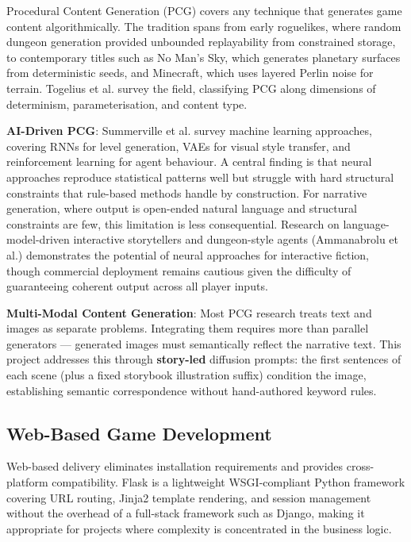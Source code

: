 \documentclass[12pt,a4paper]{article}
\begin{document}
Procedural Content Generation (PCG) covers any technique that generates game content algorithmically. The tradition spans from early roguelikes, where random dungeon generation provided unbounded replayability from constrained storage, to contemporary titles such as No Man's Sky, which generates planetary surfaces from deterministic seeds, and Minecraft, which uses layered Perlin noise for terrain. Togelius et al. \cite{togelius2011assessing} survey the field, classifying PCG along dimensions of determinism, parameterisation, and content type.

\textbf{AI-Driven PCG}: Summerville et al. \cite{summerville2018procedural} survey machine learning approaches, covering RNNs for level generation, VAEs for visual style transfer, and reinforcement learning for agent behaviour. A central finding is that neural approaches reproduce statistical patterns well but struggle with hard structural constraints that rule-based methods handle by construction. For narrative generation, where output is open-ended natural language and structural constraints are few, this limitation is less consequential. Research on language-model-driven interactive storytellers and dungeon-style agents (Ammanabrolu et al.) demonstrates the potential of neural approaches for interactive fiction, though commercial deployment remains cautious given the difficulty of guaranteeing coherent output across all player inputs.

\textbf{Multi-Modal Content Generation}: Most PCG research treats text and images as separate problems. Integrating them requires more than parallel generators --- generated images must semantically reflect the narrative text. This project addresses this through \textbf{story-led} diffusion prompts: the first sentences of each scene (plus a fixed storybook illustration suffix) condition the image, establishing semantic correspondence without hand-authored keyword rules.

    \subsection{Web-Based Game Development}

Web-based delivery eliminates installation requirements and provides cross-platform compatibility. Flask \cite{grinberg2018flask} is a lightweight WSGI-compliant Python framework covering URL routing, Jinja2 template rendering, and session management without the overhead of a full-stack framework such as Django, making it appropriate for projects where complexity is concentrated in the business logic.
\end{document}
